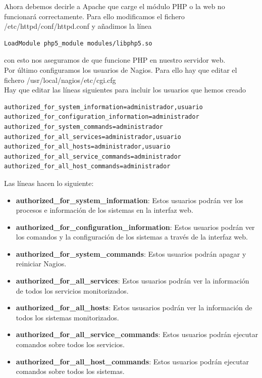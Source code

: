 \documentclass[11pt,a4paper]{article}
\begin{document}
Ahora debemos decirle a Apache que carge el módulo PHP o la web no funcionará correctamente. Para ello modificamos el fichero /etc/httpd/conf/httpd.conf y añadimos la línea

\begin{verbatim}
LoadModule php5_module modules/libphp5.so
\end{verbatim}

con esto nos aseguramos de que funcione PHP en nuestro servidor web.
\\

Por último configuramos los usuarios de Nagios. Para ello hay que editar el fichero /usr/local/nagios/etc/cgi.cfg
\\

Hay que editar las líneas siguientes para incluir los usuarios que hemos creado

\begin{verbatim}
authorized_for_system_information=administrador,usuario
authorized_for_configuration_information=administrador
authorized_for_system_commands=administrador
authorized_for_all_services=administrador,usuario
authorized_for_all_hosts=administrador,usuario
authorized_for_all_service_commands=administrador
authorized_for_all_host_commands=administrador
\end{verbatim}

Las líneas hacen lo siguiente:

\begin{itemize}
\item \textbf{authorized\_for\_system\_information}: Estos usuarios podrán ver los procesos e información de los sistemas en la interfaz web.
\item \textbf{authorized\_for\_configuration\_information}: Estos usuarios podrán ver los comandos y la configuración de los sistemas a través de la interfaz web.
\item \textbf{authorized\_for\_system\_commands}: Estos usuarios podrán apagar y reiniciar Nagios.
\item \textbf{authorized\_for\_all\_services}: Estos usuarios podrán ver la información de todos los servicios monitorizados.
\item \textbf{authorized\_for\_all\_hosts}: Estos ususarios podrán ver la información de todos los sistemas monitorizados.
\item \textbf{authorized\_for\_all\_service\_commands}: Estos usuarios podrán ejecutar comandos sobre todos los servicios.
\item \textbf{authorized\_for\_all\_host\_commands}: Estos usuarios podrán ejecutar comandos sobre todos los sistemas.
\end{itemize}
\end{document}
